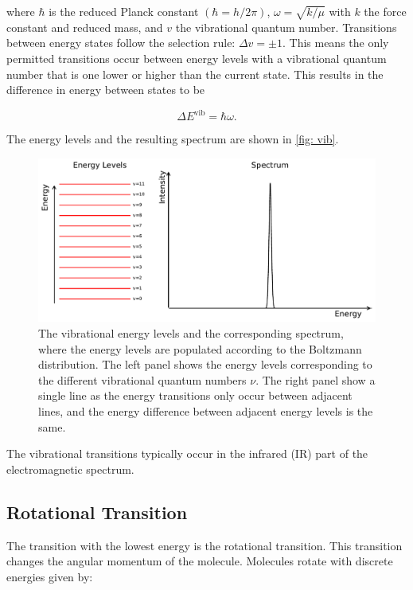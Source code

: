 \documentclass[oneside, single, authoryear, semicolon, 12pt]{lion-msc}
\newcommand{\4}{$_4$}
\newcommand{\3}{$_3$}
\newcommand{\2}{$_2$}
\begin{document}
where $\hbar$ is the reduced Planck constant $\left(\hbar=h/2\pi\right)$, $\omega=\sqrt{k/\mu}$ with $k$ the force constant and \textmu  reduced mass, and $v$ the vibrational quantum number. Transitions between energy states follow the selection rule: $\Delta v=\pm 1$. This means the only permitted transitions occur between energy levels with a vibrational quantum number that is one lower or higher than the current state. This results in the difference in energy between states to be

\begin{equation}
    \Delta E^{\mathrm{vib}}=\hbar\omega.
\end{equation}

The energy levels and the resulting spectrum are shown in \autoref{fig: vib}.

\begin{figure}[H]
    \centering
    \includegraphics[width=\linewidth]{Figures/VibSpectrum.pdf}
    \caption{The vibrational energy levels and the corresponding spectrum, where the energy levels are populated according to the Boltzmann distribution. The left panel shows the energy levels corresponding to the different vibrational quantum numbers $\nu$. The right panel show a single line as the energy transitions only occur between adjacent lines, and the energy difference between adjacent energy levels is the same.}
    \label{fig: vib}
\end{figure}

The vibrational transitions typically occur in the infrared (IR) part of the electromagnetic spectrum. 


\subsection{Rotational Transition}
The transition with the lowest energy is the rotational transition. This transition changes the angular momentum of the molecule. Molecules rotate with discrete energies given by:
\end{document}
